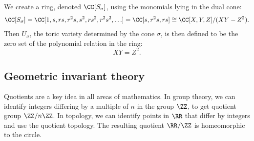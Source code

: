 \documentclass[12pt]{amsart}
\theoremstyle{plain}
\begin{document}
\begin{figure}[H]
\end{figure}
\noindent
We create a ring, denoted $\CC[S_\sigma]$, using the monomials lying in the dual cone:
$$\CC[S_\sigma] = \CC[1, s, rs, r^2s, s^2,  rs^2, r^2s^2, \ldots] = \CC[s, r^2s, rs] \cong \CC[X, Y, Z]/(XY - Z^2).$$
Then $U_\sigma$, the toric variety determined by the cone $\sigma$, is then defined to be the zero set of the polynomial relation in the ring:
$$XY = Z^2.$$

\newpage
\subsection*{Geometric invariant theory}
Quotients are a key idea in all areas of mathematics.
In group theory, we can identify integers differing by a multiple of $n$ in the group $\ZZ$, to get quotient group $\ZZ/n \ZZ$.
In topology, we can identify points in $\RR$ that differ by integers and use the quotient topology.
The resulting quotient $\RR/\ZZ$ is homeomorphic to the circle.
\end{document}
